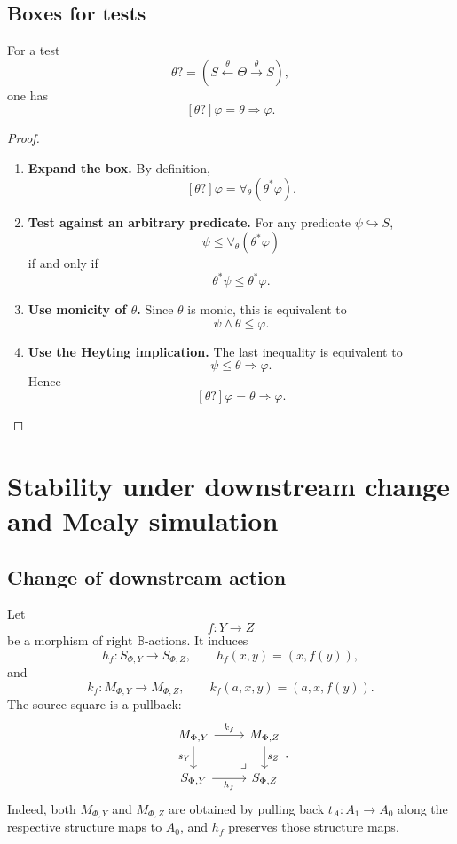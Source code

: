 \subsection{Boxes for tests}
\label{subsec:relative-boxes-tests}

\begin{proposition}
\label{prop:relative-test-box}
For a test
\[
\theta?=(S\xleftarrow{\theta}\Theta\xrightarrow{\theta}S),
\]
one has
\[
[\theta?]\varphi
=
\theta\Rightarrow\varphi.
\]
\end{proposition}

\begin{proof}
\leavevmode
\begin{enumerate}
\item \textbf{Expand the box.}
By definition,
\[
[\theta?]\varphi
=
\forall_\theta(\theta^\ast\varphi).
\]

\item \textbf{Test against an arbitrary predicate.}
For any predicate \(\psi\hookrightarrow S\),
\[
\psi\le \forall_\theta(\theta^\ast\varphi)
\]
if and only if
\[
\theta^\ast\psi\le \theta^\ast\varphi.
\]

\item \textbf{Use monicity of \(\theta\).}
Since \(\theta\) is monic, this is equivalent to
\[
\psi\wedge\theta\le\varphi.
\]

\item \textbf{Use the Heyting implication.}
The last inequality is equivalent to
\[
\psi\le\theta\Rightarrow\varphi.
\]
Hence
\[
[\theta?]\varphi=\theta\Rightarrow\varphi.
\]
\end{enumerate}
\end{proof}

\section{Stability under downstream change and Mealy simulation}
\label{sec:relative-modal-stability}

\subsection{Change of downstream action}
\label{subsec:relative-modal-stability-downstream}

Let
\[
f:Y\to Z
\]
be a morphism of right \(\mathbb B\)-actions. It induces
\[
h_f:S_{\Phi,Y}\to S_{\Phi,Z},
\qquad
h_f(x,y)=(x,f(y)),
\]
and
\[
k_f:M_{\Phi,Y}\to M_{\Phi,Z},
\qquad
k_f(a,x,y)=(a,x,f(y)).
\]
The source square is a pullback:
\[
\begin{tikzcd}
M_{\Phi,Y} \arrow[r,"k_f"] \arrow[d,"s_Y"']
&
M_{\Phi,Z} \arrow[d,"s_Z"]
\\
S_{\Phi,Y} \arrow[r,"h_f"']
&
S_{\Phi,Z}
\arrow[ul,phantom,very near start,"\lrcorner"]
\end{tikzcd}
.
\]
Indeed, both \(M_{\Phi,Y}\) and \(M_{\Phi,Z}\) are obtained by pulling back
\(t_A:A_1\to A_0\) along the respective structure maps to \(A_0\), and
\(h_f\) preserves those structure maps.

